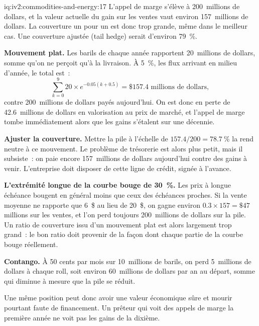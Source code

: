 \begin{solution}{iq:iv2:commodities-and-energy:17}
L'appel de marge s'élève à 200~millions de dollars, et la valeur actuelle du gain sur les ventes vaut environ 157~millions de dollars. La couverture un pour un est donc trop grande, même dans le meilleur cas. Une couverture ajustée (tail hedge) serait d'environ 79~\%.

\textbf{Mouvement plat.} Les barils de chaque année rapportent 20~millions de dollars, somme qu'on ne perçoit qu'à la livraison. À 5~\%, les flux arrivant en milieu d'année, le total est~:
\[
\sum_{k = 0}^{9} 20 \times e^{-0.05(k + 0.5)} = \$157.4 \text{ millions de dollars},
\]
contre 200~millions de dollars payés aujourd'hui. On est donc en perte de 42.6~millions de dollars en valorisation au prix de marché, et l'appel de marge tombe immédiatement alors que les gains s'étalent sur une décennie.

\textbf{Ajuster la couverture.} Mettre la pile à l'échelle de $157.4/200 = 78.7~\%$ la rend neutre à ce mouvement. Le problème de trésorerie est alors plus petit, mais il subsiste~: on paie encore 157~millions de dollars aujourd'hui contre des gains à venir. L'entreprise doit disposer de cette ligne de crédit, signée à l'avance.

\textbf{L'extrémité longue de la courbe bouge de 30~\%.} Les prix à longue échéance bougent en général moins que ceux des échéances proches. Si la vente moyenne ne rapporte que 6~\$ au lieu de 20~\$, on gagne environ $0.3 \times 157 = \$47$ millions sur les ventes, et l'on perd toujours 200~millions de dollars sur la pile. Un ratio de couverture issu d'un mouvement plat est alors largement trop grand~: le bon ratio doit provenir de la façon dont chaque partie de la courbe bouge réellement.

\textbf{Contango.} À 50 cents par mois sur 10~millions de barils, on perd 5~millions de dollars à chaque roll, soit environ 60~millions de dollars par an au départ, somme qui diminue à mesure que la pile se réduit.

Une même position peut donc avoir une valeur économique sûre et mourir pourtant faute de financement. Un prêteur qui voit des appels de marge la première année ne voit pas les gains de la dixième.

\end{solution}

